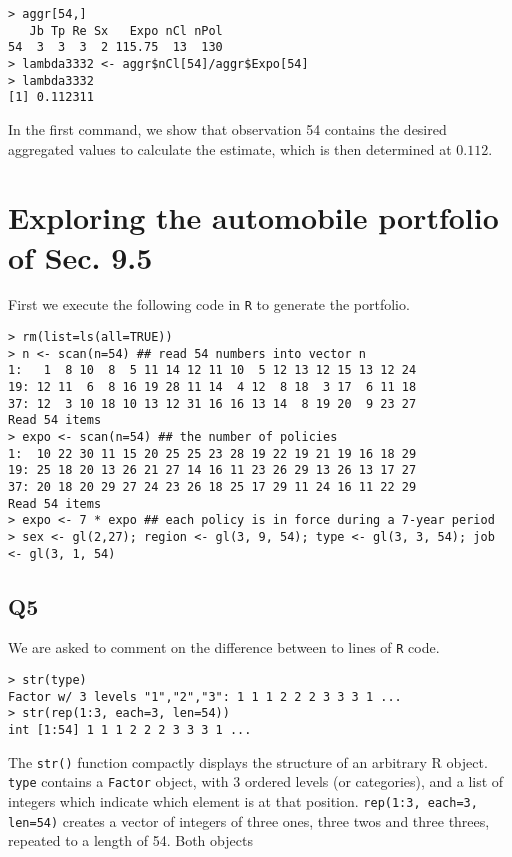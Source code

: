 \documentclass[11pt]{article}
\begin{document}
\begin{verbatim}
> aggr[54,]
   Jb Tp Re Sx   Expo nCl nPol
54  3  3  3  2 115.75  13  130
> lambda3332 <- aggr$nCl[54]/aggr$Expo[54]
> lambda3332
[1] 0.112311
\end{verbatim}

In the first command, we show that observation 54 contains the desired aggregated values to calculate the estimate, which is then determined at $0.112$.

\section{Exploring the automobile portfolio of Sec. 9.5}

First we execute the following code in \verb|R| to generate the portfolio.

\begin{verbatim}
> rm(list=ls(all=TRUE)) 
> n <- scan(n=54) ## read 54 numbers into vector n
1:   1  8 10  8  5 11 14 12 11 10  5 12 13 12 15 13 12 24
19: 12 11  6  8 16 19 28 11 14  4 12  8 18  3 17  6 11 18
37: 12  3 10 18 10 13 12 31 16 16 13 14  8 19 20  9 23 27
Read 54 items
> expo <- scan(n=54) ## the number of policies 
1:  10 22 30 11 15 20 25 25 23 28 19 22 19 21 19 16 18 29
19: 25 18 20 13 26 21 27 14 16 11 23 26 29 13 26 13 17 27
37: 20 18 20 29 27 24 23 26 18 25 17 29 11 24 16 11 22 29
Read 54 items
> expo <- 7 * expo ## each policy is in force during a 7-year period
> sex <- gl(2,27); region <- gl(3, 9, 54); type <- gl(3, 3, 54); job <- gl(3, 1, 54)
\end{verbatim}

\subsection*{Q5}

We are asked to comment on the difference between to lines of \verb|R| code.

\begin{verbatim}
> str(type)
Factor w/ 3 levels "1","2","3": 1 1 1 2 2 2 3 3 3 1 ...
> str(rep(1:3, each=3, len=54))
int [1:54] 1 1 1 2 2 2 3 3 3 1 ...
\end{verbatim}

The \verb|str()| function compactly displays the structure of an arbitrary R object.
\verb|type| contains a \verb|Factor| object, with 3 ordered levels (or categories), and a list of integers which indicate which element is at that position.
\verb|rep(1:3, each=3, len=54)| creates a vector of integers of three ones, three twos and three threes, repeated to a length of 54. Both objects
\end{document}
